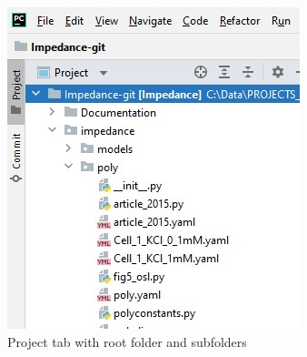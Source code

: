 \begin{figure}[H]
	\centering
	\begin{subfigure}[b]{0.45\textwidth}
		\includegraphics[width=\textwidth]{Figures/project_tab.jpg}
		\caption{Project tab with root folder and subfolders}
		\label{fig:pycharm_projecttab}
	\end{subfigure}
	\hfill
	\begin{subfigure}[b]{0.3\textwidth}

\end{subfigure}
\end{figure}
